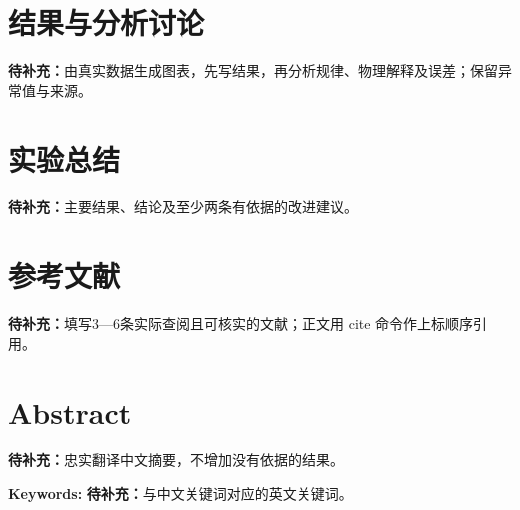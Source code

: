 \documentclass[UTF8,a4paper,10pt,twocolumn,fontset=fandol,scheme=plain]{ctexart}
\newcommand{\ReportTODO}[1]{\textbf{待补充：}#1}
\begin{document}
\section{结果与分析讨论}\label{sec:results}
\ReportTODO{由真实数据生成图表，先写结果，再分析规律、物理解释及误差；保留异常值与来源。}

\section{实验总结}\label{sec:conclusion}
\ReportTODO{主要结果、结论及至少两条有依据的改进建议。}

\section{参考文献}
\ReportTODO{填写3—6条实际查阅且可核实的文献；正文用 cite 命令作上标顺序引用。}

\par\bigskip\noindent\begin{minipage}{\linewidth}
\section*{Abstract}
\ReportTODO{忠实翻译中文摘要，不增加没有依据的结果。}
\par\noindent\textbf{Keywords: }\ReportTODO{与中文关键词对应的英文关键词。}
\end{minipage}\par

\end{document}
